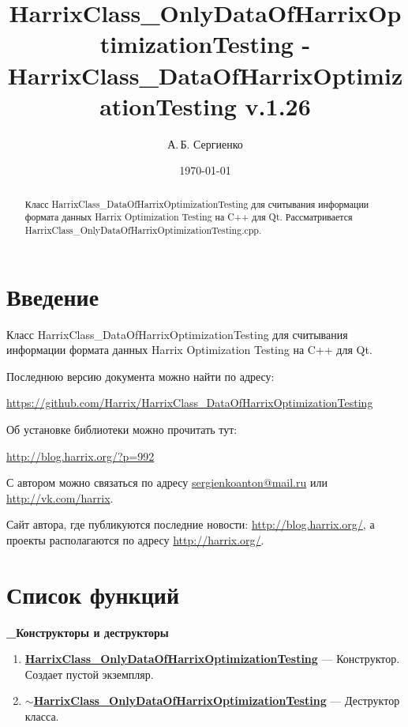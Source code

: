 \documentclass[a4paper,12pt]{article}
\title{Har\-rix\-Class\_On\-ly\-Da\-ta\-Of\-Har\-rix\-Op\-ti\-mi\-za\-tion\-Test\-ing - Har\-rix\-Class\_Da\-ta\-Of\-Har\-rix\-Op\-ti\-mi\-za\-ti\-on\-Tes\-ting v.1.26}
\author{А.\,Б. Сергиенко}
\date{\today}
\begin{document}


\maketitle

\begin{abstract}
Класс HarrixClass\_DataOfHarrixOptimizationTesting для считывания информации формата данных Harrix Optimization Testing на C++ для Qt. Рассматривается HarrixClass\_OnlyDataOfHarrixOptimizationTesting.cpp.
\end{abstract}

\tableofcontents

\newpage

\section{Введение}

Класс HarrixClass\_DataOfHarrixOptimizationTesting для считывания информации формата данных Harrix Optimization Testing на C++ для Qt.

Последнюю версию документа можно найти по адресу:

\href{https://github.com/Harrix/HarrixClass\_DataOfHarrixOptimizationTesting}{https://github.com/Harrix/HarrixClass\_DataOfHarrixOptimizationTesting}

Об установке библиотеки можно прочитать тут:

\href{http://blog.harrix.org/?p=992}{http://blog.harrix.org/?p=992}

С автором можно связаться по адресу \href{mailto:sergienkoanton@mail.ru}{sergienkoanton@mail.ru} или  \href{http://vk.com/harrix}{http://vk.com/harrix}.

Сайт автора, где публикуются последние новости: \href{http://blog.harrix.org/}{http://blog.harrix.org/}, а проекты располагаются по адресу \href{http://harrix.org/}{http://harrix.org/}.

\newpage
\section{Список функций}\label{section_listfunctions}
\textbf{\_Конструкторы и деструкторы}
\begin{enumerate}
	
	\item \textbf{\hyperref[HarrixClass_OnlyDataOfHarrixOptimizationTesting]{HarrixClass\_OnlyDataOfHarrixOptimizationTesting}} --- Конструктор. Создает пустой экземпляр.
	
	\item \textbf{\hyperref[tildaHarrixClass_OnlyDataOfHarrixOptimizationTesting]{$\sim$HarrixClass\_OnlyDataOfHarrixOptimizationTesting}} --- Деструктор класса.
	
\end{enumerate}
\end{document}
